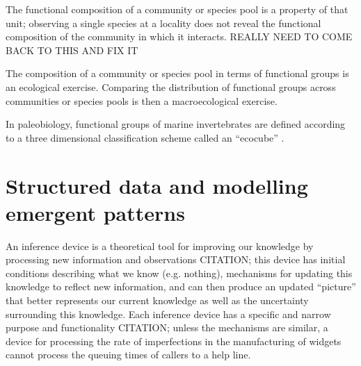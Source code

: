 The functional composition of a community or species pool is a property of that unit; observing a single species at a locality does not reveal the functional composition of the community in which it interacts. \uppercase{really need to come back to this and fix it}

The composition of a community or species pool in terms of functional groups is an ecological exercise. Comparing the distribution of functional groups across communities or species pools is then a macroecological exercise. 

In paleobiology, functional groups of marine invertebrates are defined according to a three dimensional classification scheme called an ``ecocube'' \citep{Bush2007,Bambach2007}.





\section{Structured data and modelling emergent patterns}



An inference device is a theoretical tool for improving our knowledge by processing new information and observations \citep{McElreath2016} CITATION; this device has initial conditions describing what we know (e.g. nothing), mechanisms for updating this knowledge to reflect new information, and can then produce an updated ``picture'' that better represents our current knowledge as well as the uncertainty surrounding this knowledge. Each inference device has a specific and narrow purpose and functionality \citep{McElreath2016} CITATION; unless the mechanisms are similar, a device for processing the rate of imperfections in the manufacturing of widgets cannot process the queuing times of callers to a help line.  

